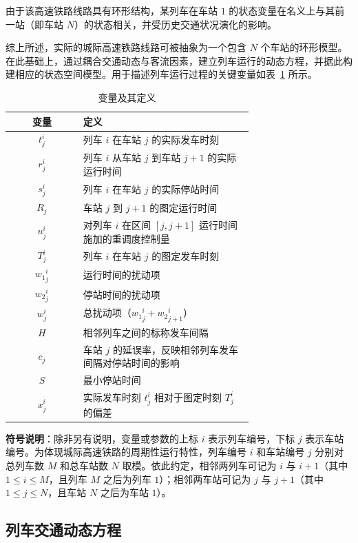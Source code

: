由于该高速铁路线路具有环形结构，某列车在车站 $1$ 的状态变量在名义上与其前一站（即车站 $N$）的状态相关，并受历史交通状况演化的影响。

综上所述，实际的城际高速铁路线路可被抽象为一个包含 $N$ 个车站的环形模型。在此基础上，通过耦合交通动态与客流因素，建立列车运行的动态方程，并据此构建相应的状态空间模型。用于描述列车运行过程的关键变量如表~\ref{table1} 所示。

\begin{table}
	\centering
	\caption{变量及其定义}
	\label{table1}
	\begin{tabular}{cp{0.7\linewidth}}
		\hline
		变量 & 定义 \\
		\hline
		$t_{j}^{i}$ & 列车 $i$ 在车站 $j$ 的实际发车时刻 \\
		$r_{j}^{i}$ & 列车 $i$ 从车站 $j$ 到车站 $j+1$ 的实际运行时间 \\
		$s_{j}^{i}$ & 列车 $i$ 在车站 $j$ 的实际停站时间 \\
		$R_{j}$ & 车站 $j$ 到 $j+1$ 的图定运行时间 \\
		$u_{j}^{i}$ & 对列车 $i$ 在区间 $[j, j+1]$ 运行时间施加的重调度控制量 \\
		$T_{j}^{i}$ & 列车 $i$ 在车站 $j$ 的图定发车时刻 \\
		${w_1}_{j}^{i}$ & 运行时间的扰动项 \\
		${w_2}_{j}^{i}$ & 停站时间的扰动项 \\
		$w_{j}^{i}$ & 总扰动项（${w_1}_{j}^{i} + {w_2}_{j+1}^{i}$）\\
		$H$ & 相邻列车之间的标称发车间隔 \\
		$c_{j}$ & 车站 $j$ 的延误率，反映相邻列车发车间隔对停站时间的影响 \\
		$S$ & 最小停站时间 \\
		$x_{j}^{i}$ & 实际发车时刻 $t_j^i$ 相对于图定时刻 $T_j^i$ 的偏差 \\
		\hline
	\end{tabular}
\end{table}

\noindent\textbf{符号说明}：除非另有说明，变量或参数的上标 $i$ 表示列车编号，下标 $j$ 表示车站编号。为体现城际高速铁路的周期性运行特性，列车编号 $i$ 和车站编号 $j$ 分别对总列车数 $M$ 和总车站数 $N$ 取模。依此约定，相邻两列车可记为 $i$ 与 $i+1$（其中 $1 \leq i \leq M$，且列车 $M$ 之后为列车 $1$）；相邻两车站可记为 $j$ 与 $j+1$（其中 $1 \leq j \leq N$，且车站 $N$ 之后为车站 $1$）。

\subsection{列车交通动态方程}

